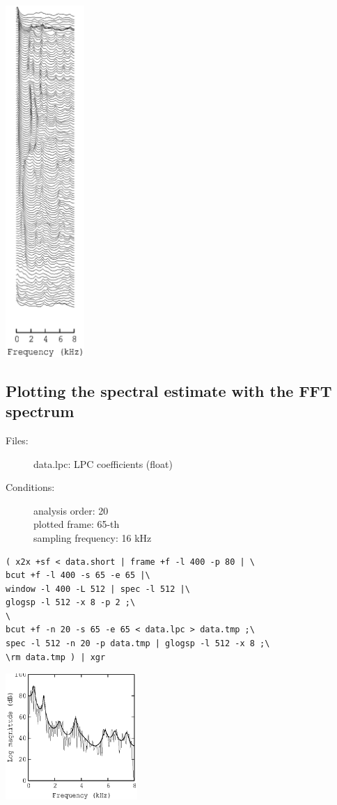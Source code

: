 \documentclass[a4paper,10pt]{article}
\begin{document}
\includegraphics[width=3cm]{eps/data.lpc.grlogsp.eps}

\subsection{Plotting the spectral estimate with the FFT spectrum}

\begin{description}
\item[Files:]
  data.lpc: LPC coefficients (float)
\item[Conditions:]
  analysis order: 20\\
  plotted frame: 65-th\\
  sampling frequency: 16 kHz
\end{description}

\begin{verbatim}
( x2x +sf < data.short | frame +f -l 400 -p 80 | \
bcut +f -l 400 -s 65 -e 65 |\
window -l 400 -L 512 | spec -l 512 |\
glogsp -l 512 -x 8 -p 2 ;\
\
bcut +f -n 20 -s 65 -e 65 < data.lpc > data.tmp ;\
spec -l 512 -n 20 -p data.tmp | glogsp -l 512 -x 8 ;\
\rm data.tmp ) | xgr
\end{verbatim}

\includegraphics[width=5cm]{eps/data.lpc.glogsp.eps}
\end{document}
